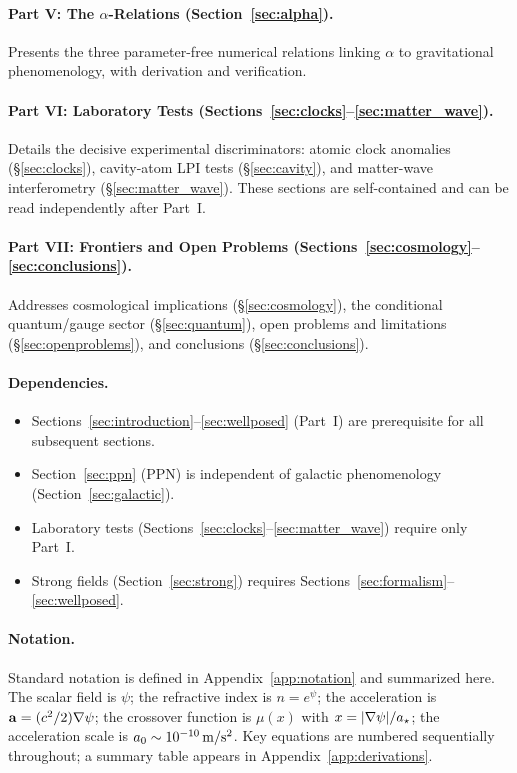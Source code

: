 \paragraph{Part V: The $\alpha$-Relations (Section~\ref{sec:alpha}).}
Presents the three parameter-free numerical relations linking $\alpha$ to 
gravitational phenomenology, with derivation and verification.

\paragraph{Part VI: Laboratory Tests (Sections~\ref{sec:clocks}--\ref{sec:matter_wave}).}
Details the decisive experimental discriminators: atomic clock anomalies 
(\S\ref{sec:clocks}), cavity-atom LPI tests (\S\ref{sec:cavity}), 
and matter-wave interferometry (\S\ref{sec:matter_wave}). These sections 
are self-contained and can be read independently after Part~I.

\paragraph{Part VII: Frontiers and Open Problems 
(Sections~\ref{sec:cosmology}--\ref{sec:conclusions}).}
Addresses cosmological implications (\S\ref{sec:cosmology}), the conditional 
quantum/gauge sector (\S\ref{sec:quantum}), open problems and limitations 
(\S\ref{sec:openproblems}), and conclusions (\S\ref{sec:conclusions}).

\paragraph{Dependencies.}
\begin{itemize}
\item Sections~\ref{sec:introduction}--\ref{sec:wellposed} (Part~I) are 
prerequisite for all subsequent sections.
\item Section~\ref{sec:ppn} (PPN) is independent of galactic phenomenology 
(Section~\ref{sec:galactic}).
\item Laboratory tests (Sections~\ref{sec:clocks}--\ref{sec:matter_wave}) 
require only Part~I.
\item Strong fields (Section~\ref{sec:strong}) requires 
Sections~\ref{sec:formalism}--\ref{sec:wellposed}.
\end{itemize}

\paragraph{Notation.}
Standard notation is defined in Appendix~\ref{app:notation} and summarized 
here. The scalar field is $\psi$; the refractive index is $n = e^\psi$; 
the acceleration is $\avec = (c^2/2)\nabla\psi$; the crossover function 
is $\mu(x)$ with $x = |\nabla\psi|/\astar$; the acceleration scale is 
$\azero \sim 10^{-10}\,\si{m/s^2}$. Key equations are numbered sequentially 
throughout; a summary table appears in Appendix~\ref{app:derivations}.

